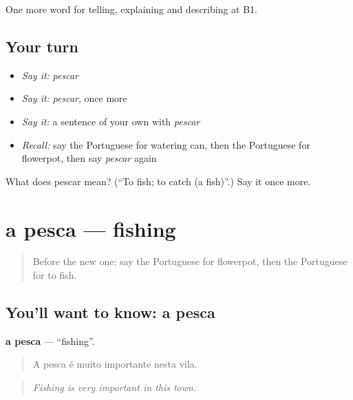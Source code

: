 \begin{grammarlens}[title={What you've built}]
One more word for telling, explaining and describing at B1.
\end{grammarlens}

\subsection*{Your turn}
\begin{itemize}
\raggedright
  \item \emph{Say it:} \emph{pescar}
  \item \emph{Say it:} \emph{pescar}, once more
  \item \emph{Say it:} a sentence of your own with \emph{pescar}
  \item \emph{Recall:} say the Portuguese for watering can, then the Portuguese for flowerpot, then say \emph{pescar} again
\end{itemize}

\begin{tcolorbox}[breakable,colback=teal!4,colframe=teal!35!black,title={Before you move on}]
What does pescar mean? (\textquotedblleft{}To fish; to catch (a fish)\textquotedblright{}.) Say it once more.
\end{tcolorbox}
\section[a pesca]{a pesca — fishing}

\label{lesson:PT-C502-pesca}



\begin{quote}
Before the new one: say the Portuguese for flowerpot, then the Portuguese for to fish.
\end{quote}

\subsection*{You'll want to know: a pesca}
\textbf{a pesca} — \textquotedblleft{}fishing\textquotedblright{}.

\begin{quote}
A pesca é muito importante nesta vila.
\end{quote}

\begin{quote}
\emph{Fishing is very important in this town.}
\end{quote}

